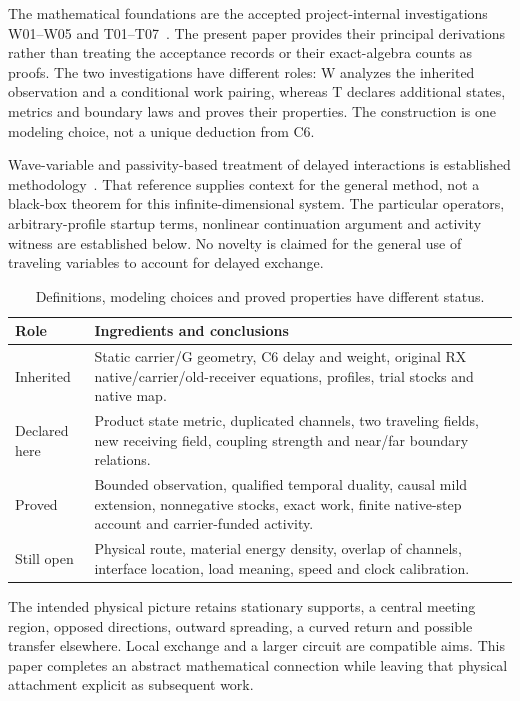 The mathematical foundations are the accepted project-internal investigations W01--W05 and T01--T07~\cite{Wreview,Treview}. The present paper provides their principal derivations rather than treating the acceptance records or their exact-algebra counts as proofs. The two investigations have different roles: W analyzes the inherited observation and a conditional work pairing, whereas T declares additional states, metrics and boundary laws and proves their properties. The construction is one modeling choice, not a unique deduction from C6.

Wave-variable and passivity-based treatment of delayed interactions is established methodology~\cite{niemeyer}. That reference supplies context for the general method, not a black-box theorem for this infinite-dimensional system. The particular operators, arbitrary-profile startup terms, nonlinear continuation argument and activity witness are established below. No novelty is claimed for the general use of traveling variables to account for delayed exchange.

\begin{table}[htbp]\centering\small
\begin{tabularx}{\textwidth}{@{}p{}X@{}}\toprule
Role & Ingredients and conclusions\\\midrule
Inherited & Static carrier/G geometry, C6 delay and weight, original RX native/carrier/old-receiver equations, profiles, trial stocks and native map.\\[3pt]
Declared here & Product state metric, duplicated channels, two traveling fields, new receiving field, coupling strength and near/far boundary relations.\\[3pt]
Proved & Bounded observation, qualified temporal duality, causal mild extension, nonnegative stocks, exact work, finite native-step account and carrier-funded activity.\\[3pt]
Still open & Physical route, material energy density, overlap of channels, interface location, load meaning, speed and clock calibration.\\\bottomrule
\end{tabularx}
\caption{Definitions, modeling choices and proved properties have different status.}\label{tab:roles}
\end{table}

The intended physical picture retains stationary supports, a central meeting region, opposed directions, outward spreading, a curved return and possible transfer elsewhere. Local exchange and a larger circuit are compatible aims. This paper completes an abstract mathematical connection while leaving that physical attachment explicit as subsequent work.
